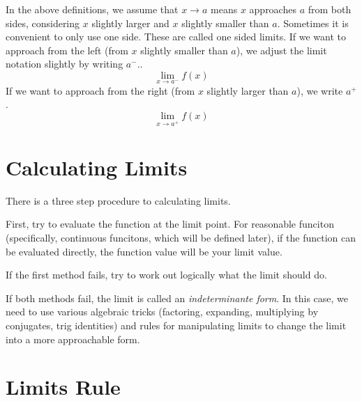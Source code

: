 \documentclass[fleqn]{report}
\begin{document}
In the above definitions, we assume that $x \rightarrow a$
means $x$ approaches $a$ from both sides, considering $x$ slightly
larger and $x$ slightly smaller than $a$. Sometimes it is
convenient to only use one side. These are called one sided
limits. If we want to approach from the left (from $x$
slightly smaller than $a$), we adjust the limit notation
slightly by writing $a^-$..
\begin{equation*}
\lim_{x \rightarrow a^-} f(x)
\end{equation*}
If we want to approach from the right (from $x$ slightly
larger than $a$), we write $a^+$. 
\begin{equation*}
\lim_{x \rightarrow a^+} f(x)
\end{equation*}

\section*{Calculating Limits}

There is a three step procedure to calculating limits.
\begin{smallitemize}
\item First, try to evaluate the function at the limit point.
For reasonable funciton (specifically, continuous funcitons,
which will be defined later), if the function can be evaluated
directly, the function value will be your limit value.
\item If the first method fails, try to work out logically
what the limit should do. 
\item If both methods fail, the limit is called an
\emph{indeterminante form}. In this case, we need to use
various algebraic tricks (factoring, expanding, multiplying by
conjugates, trig identities) and rules for manipulating limits
to change the limit into a more approachable form.
\end{smallitemize}

\section*{Limits Rule}
\end{document}
